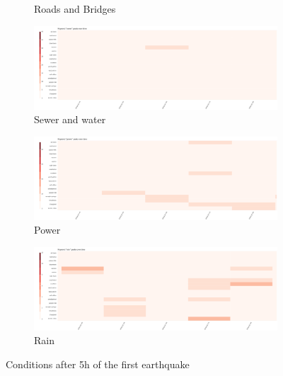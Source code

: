 \begin{figure}[!h]
\begin{subfigure}[!h]{0.32\textwidth}
        \caption{Roads and Bridges}
        \label{fig:road_5h}
    \end{subfigure}
    \begin{subfigure}[!h]{0.32\textwidth}
        \centering
        \includegraphics[width=1.00\textwidth]{figs/q1/cond_5h/cond_5h_sewer.png}
        \caption{Sewer and water}
        \label{fig:sewer_5h}
    \end{subfigure}
    \begin{subfigure}[!h]{0.32\textwidth}
        \centering
        \includegraphics[width=1.00\textwidth]{figs/q1/cond_5h/cond_5h_power.png}
        \caption{Power}
        \label{fig:power_5h}
    \end{subfigure}
    \begin{subfigure}[!h]{0.32\textwidth}
        \centering
        \includegraphics[width=1.00\textwidth]{figs/q1/cond_5h/cond_5h_rain.png}
        \caption{Rain}
        \label{fig:rain_5h}
    \end{subfigure}
    \caption{Conditions after 5h of the first earthquake}
    \label{fig:eq_cond_5h}
\end{figure}

